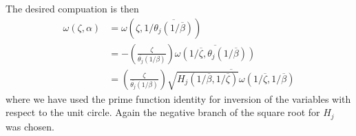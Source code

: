\documentclass[12pt,fleqn]{article}
\newcommand{\conj}[1]{\overline{#1}}
\begin{document}
The desired compuation is then
\begin{align}
  \omega(\zeta,\alpha) &= \omega(\zeta,1/\conj{\theta_j(1/\conj{\beta})}) \nonumber \\
  &= -\left( \frac{\zeta}{\conj{\theta_j}(1/\beta)} \right) \conj{\omega(1/\conj{\zeta}, \theta_j(1/\conj{\beta}))} \nonumber \\
  &= \left( \frac{\zeta}{\conj{\theta_j}(1/\beta)} \right) \conj{\sqrt{H_j(1/\conj{\beta},1/\conj{\zeta})} \omega(1/\conj{\zeta}, 1/\conj{\beta})}
\end{align}
where we have used the prime function identity for inversion of the variables with respect to the unit circle. Again the negative branch of the square root for $H_j$ was chosen.
\end{document}
